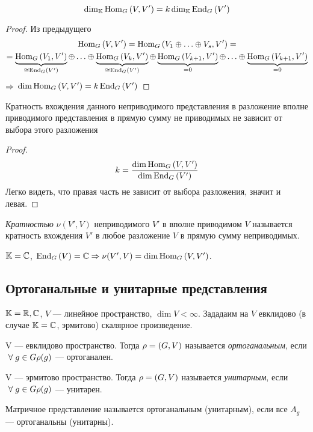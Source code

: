 \begin{stm}
	$$
		\dim_{\mathbb{K}}\operatorname{Hom}_G\left(V, V'\right) = k \dim_{\mathbb{K}}\operatorname{End}_G\left(V'\right)
	$$
\end{stm}
\begin{proof}
	Из предыдущего
	\begin{gather*}
		\Hom_G\hr{V, V'} = \Hom_G\hr{V_1 \sop V_s, V'} = \\
		= \ub{\Hom_G\hr{V_1, V'}}_{\cong\End_G\hr{V'}} \sop \ub{\Hom_G\hr{V_k, V'}}_{\cong\End_G\hr{V'}} \oplus
		\ub{\Hom_G\hr{V_{k + 1}, V'}}_{=0} \sop \ub{\Hom_G\hr{V_{k + 1}, V'}}_{=0}
	\end{gather*}
	$\Rightarrow$ $\dim \operatorname{Hom}_G \left(V, V'\right) = k \operatorname{End}_G\left(V'\right)$
\end{proof}
\begin{theorem}
	Кратность вхождения данного неприводимого представления
	в разложение вполне приводимого представления в прямую
	сумму не приводимых не зависит от выбора этого разложения
\end{theorem}
\begin{proof}
	$$
		k = \frac{\dim\operatorname{Hom}_G\left(V, V'\right)}{\dim\operatorname{End}_G\left(V'\right)}
	$$
	Легко видеть, что правая часть не зависит от выбора разложения, значит и левая.
\end{proof}
\begin{df}
	\textit{Кратностью} $\nu(V', V)$ неприводимого $V'$ в вполне приводимом $V$ называется
	кратность вхождения $V'$ в любое разложение $V$ в прямую сумму неприводимых.
\end{df}
\begin{imp}
	$\mathbb{K} = \mathbb{C}$, $\operatorname{End}_G\left(V\right) = \mathbb{C} \Rightarrow \nu(V', V) = \dim\operatorname{Hom}_G\left(V, V'\right)$.
\end{imp}


\subsection{Ортоганальные и унитарные представления}
$\mathbb{K} = \mathbb{R}, \mathbb{C}$, $V$ --- линейное пространство, $\dim V < \infty$.
Зададаим на $V$ евклидово (в случае $\mathbb{K} = \mathbb{C}$, эрмитово) скалярное произведение.
\begin{df}
	V --- евклидово пространство.
	Тогда $\rho = \left(G, V\right)$ называется \textit{ортоганальным}, если
	$~\forall\; g \in G \rho(g)$ --- ортоганален.

	V --- эрмитово пространство.
	Тогда $\rho = \left(G, V\right)$ называется \textit{унитарным}, если
	$~\forall\; g \in G \rho(g)$ --- унитарен.

	Матричное представление называется ортоганальным (унитарным),
	если все $A_g$ --- ортоганальны (унитарны).
\end{df}

